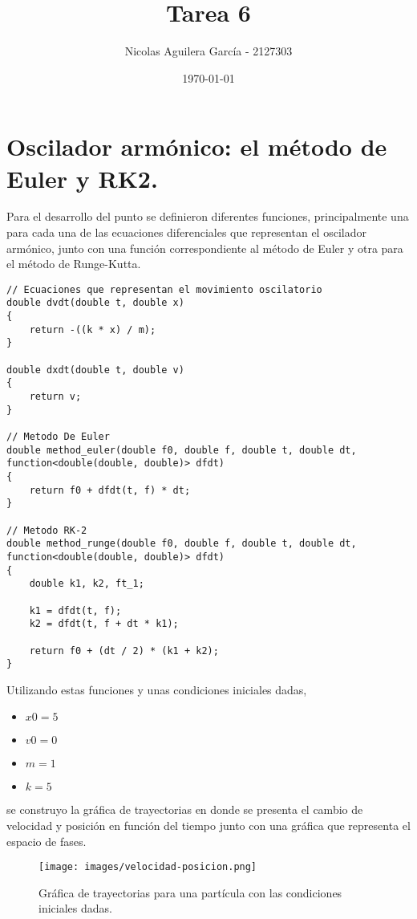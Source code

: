 \documentclass[10pt]{article}
\title{Tarea 6}
\author{Nicolas Aguilera García - 2127303}
\date{\today}
\begin{document}
    \maketitle

    \section{Oscilador armónico: el método de Euler y RK2.}
    Para el desarrollo del punto se definieron diferentes funciones, principalmente una para cada una de las ecuaciones diferenciales que representan el oscilador armónico, junto con una función correspondiente al método de Euler y otra para el método de Runge-Kutta.
    
    \begin{verbatim}
// Ecuaciones que representan el movimiento oscilatorio
double dvdt(double t, double x)
{
    return -((k * x) / m);
}

double dxdt(double t, double v)
{
    return v;
}

// Metodo De Euler
double method_euler(double f0, double f, double t, double dt, function<double(double, double)> dfdt)
{
    return f0 + dfdt(t, f) * dt;
}

// Metodo RK-2
double method_runge(double f0, double f, double t, double dt, function<double(double, double)> dfdt)
{
    double k1, k2, ft_1;

    k1 = dfdt(t, f);
    k2 = dfdt(t, f + dt * k1);

    return f0 + (dt / 2) * (k1 + k2);
}
    \end{verbatim}
    
    Utilizando estas funciones y unas condiciones iniciales dadas, 
    
    \begin{itemize}
        \item $x0 = 5$
        \item $v0 = 0$
        \item $m = 1$
        \item $k = 5$
    \end{itemize} 
    
    se construyo la gráfica de trayectorias en donde se presenta el cambio de velocidad y posición en función del tiempo junto con una gráfica que representa el espacio de fases.
    
    \begin{figure}[H]
        \centering
        \texttt{[image: images/velocidad-posicion.png]}
        \caption{Gráfica de trayectorias para una partícula con las condiciones iniciales dadas.}
        \label{img}
    \end{figure}
    
\end{document}
